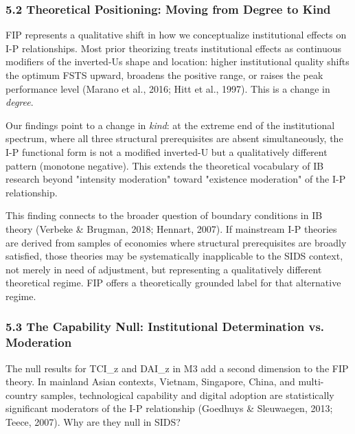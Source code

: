 \documentclass[12pt,a4paper]{article}
\begin{document}
\hypertarget{52-theoretical-positioning-moving-from-degree-to-kind}{%
\subsubsection{5.2 Theoretical Positioning: Moving from Degree to
Kind}\label{52-theoretical-positioning-moving-from-degree-to-kind}}

FIP represents a qualitative shift in how we conceptualize institutional
effects on I-P relationships. Most prior theorizing treats institutional
effects as continuous modifiers of the inverted-U\textquotesingle s
shape and location: higher institutional quality shifts the optimum FSTS
upward, broadens the positive range, or raises the peak performance
level (Marano et al., 2016; Hitt et al., 1997). This is a change in
\emph{degree}.

Our findings point to a change in \emph{kind}: at the extreme end of the
institutional spectrum, where all three structural prerequisites are
absent simultaneously, the I-P functional form is not a modified
inverted-U but a qualitatively different pattern (monotone negative).
This extends the theoretical vocabulary of IB research beyond "intensity
moderation" toward "existence moderation" of the I-P relationship.

This finding connects to the broader question of boundary conditions in
IB theory (Verbeke \& Brugman, 2018; Hennart, 2007). If mainstream I-P
theories are derived from samples of economies where structural
prerequisites are broadly satisfied, those theories may be
systematically inapplicable to the SIDS context, not merely in need of
adjustment, but representing a qualitatively different theoretical
regime. FIP offers a theoretically grounded label for that alternative
regime.

\hypertarget{53-the-capability-null-institutional-determination-vs-moderation}{%
\subsubsection{5.3 The Capability Null: Institutional Determination vs.
Moderation}\label{53-the-capability-null-institutional-determination-vs-moderation}}

The null results for TCI\_z and DAI\_z in M3 add a second dimension to
the FIP theory. In mainland Asian contexts, Vietnam, Singapore, China,
and multi-country samples, technological capability and digital adoption
are statistically significant moderators of the I-P relationship
(Goedhuys \& Sleuwaegen, 2013; Teece, 2007). Why are they null in SIDS?
\end{document}
